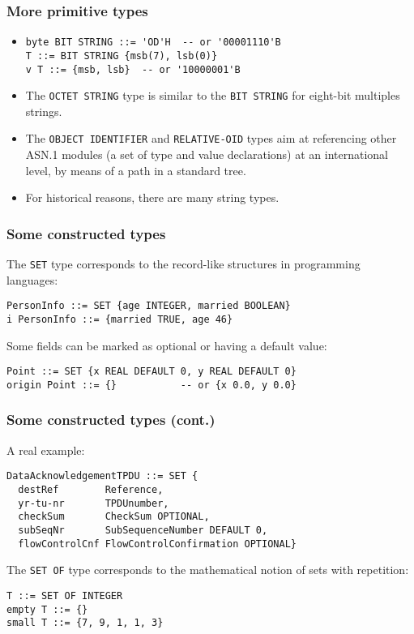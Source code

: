 \documentclass[compress,dvips,xcolor={dvipsnames},t]{beamer}
\newcommand\ASN{\textsf{ASN.1}\xspace}
\begin{document}
\begin{frame}[containsverbatim]
\frametitle{More primitive types}

\begin{itemize}

  \item
\begin{verbatim}
byte BIT STRING ::= 'OD'H  -- or '00001110'B
T ::= BIT STRING {msb(7), lsb(0)}
v T ::= {msb, lsb}  -- or '10000001'B
\end{verbatim}

 \item The \texttt{OCTET STRING} type is similar to the \texttt{BIT
       STRING} for eight-bit multiples strings.

 \item The \texttt{OBJECT IDENTIFIER} and \texttt{RELATIVE-OID} types
       aim at referencing other \ASN modules (a set of type
       and value declarations) at an international level, by means of
       a path in a standard tree.

  \item For historical reasons, there are many string types.

\end{itemize}

\end{frame}

\begin{frame}[containsverbatim]
\frametitle{Some constructed types}

The \texttt{SET} type corresponds to the record-like structures in
programming languages:
\begin{verbatim}
PersonInfo ::= SET {age INTEGER, married BOOLEAN}
i PersonInfo ::= {married TRUE, age 46}
\end{verbatim}
Some fields can be marked as optional or having a default value:
\begin{verbatim}
Point ::= SET {x REAL DEFAULT 0, y REAL DEFAULT 0}
origin Point ::= {}           -- or {x 0.0, y 0.0}
\end{verbatim}

\end{frame}

\begin{frame}[containsverbatim]
\frametitle{Some constructed types (cont.)}

A real example:
\begin{verbatim}
DataAcknowledgementTPDU ::= SET {
  destRef        Reference,
  yr-tu-nr       TPDUnumber,
  checkSum       CheckSum OPTIONAL,
  subSeqNr       SubSequenceNumber DEFAULT 0,
  flowControlCnf FlowControlConfirmation OPTIONAL}
\end{verbatim}

The \texttt{SET OF} type corresponds to the mathematical notion of
sets with repetition:
\begin{verbatim}
T ::= SET OF INTEGER
empty T ::= {}
small T ::= {7, 9, 1, 1, 3}
\end{verbatim}

\end{frame}
\end{document}
